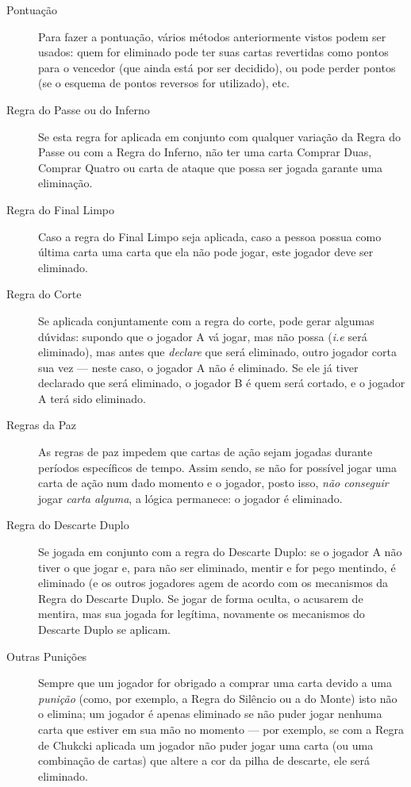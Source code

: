 \begin{description}
\item[Pontuação]{Para fazer a pontuação, vários métodos anteriormente vistos podem ser usados: quem for eliminado pode ter suas cartas revertidas como pontos para o vencedor (que ainda está por ser decidido), ou pode perder pontos (se o esquema de pontos reversos for utilizado), etc.}
\item[Regra do Passe ou do Inferno]{Se esta regra for aplicada em conjunto com qualquer variação da Regra do Passe ou com a Regra do Inferno, não ter uma carta Comprar Duas, Comprar Quatro ou carta de ataque que possa ser jogada garante uma eliminação.}
\item[Regra do Final Limpo]{Caso a regra do Final Limpo seja aplicada, caso a pessoa possua como última carta uma carta que ela não pode jogar, este jogador deve ser eliminado.}
\item[Regra do Corte]{Se aplicada conjuntamente com a regra do corte, pode gerar algumas dúvidas: supondo que o jogador A vá jogar, mas não possa (\emph{i.e} será eliminado), mas antes que \emph{declare} que será eliminado, outro jogador corta sua vez --- neste caso, o jogador A não é eliminado. Se ele já tiver declarado que será eliminado, o jogador B é quem será cortado, e o jogador A terá sido eliminado.}
\item[Regras da Paz]{As regras de paz impedem que cartas de ação sejam jogadas durante períodos específicos de tempo. Assim sendo, se não for possível jogar uma carta de ação num dado momento e o jogador, posto isso, \emph{não conseguir} jogar \emph{carta alguma}, a lógica permanece: o jogador é eliminado.}
\item[Regra do Descarte Duplo]{Se jogada em conjunto com a regra do Descarte Duplo: se o jogador A não tiver o que jogar e, para não ser eliminado, mentir e for pego mentindo, é eliminado (e os outros jogadores agem de acordo com os mecanismos da Regra do Descarte Duplo. Se jogar de forma oculta, o acusarem de mentira, mas sua jogada for legítima, novamente os mecanismos do Descarte Duplo se aplicam.}
\item[Outras Punições]{Sempre que um jogador for obrigado a comprar uma carta devido a uma \emph{punição} (como, por exemplo, a Regra do Silêncio ou a do Monte) isto não o elimina; um jogador é apenas eliminado se não puder jogar nenhuma carta que estiver em sua mão no momento --- por exemplo, se com a Regra de Chukcki aplicada um jogador não puder jogar uma carta (ou uma combinação de cartas) que altere a cor da pilha de descarte, ele será eliminado.}
\end{description}

